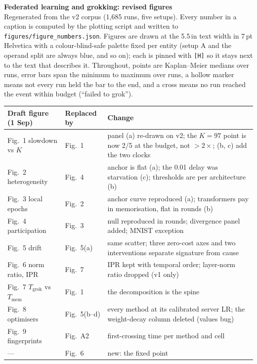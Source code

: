 \documentclass[10pt]{article}
\begin{document}
{\Large\bfseries Federated learning and grokking: revised figures}\\[2pt]
{\small Regenerated from the v2 corpus (1{,}685 runs, five setups). Every number in a caption is computed by the plotting script and written to \texttt{figures/figure\_numbers.json}. Figures are drawn at the 5.5\,in text width in 7\,pt Helvetica with a colour-blind-safe palette fixed per entity (setup A and the operand split are always blue, and so on); each is pinned with \texttt{[H]} so it stays next to the text that describes it. Throughout, points are Kaplan--Meier medians over runs, error bars span the minimum to maximum over runs, a hollow marker means not every run held the bar to the end, and a cross means no run reached the event within budget (``failed to grok'').}

\medskip
\begin{tabular}{@{}p{1.0in}p{0.65in}p{3.4in}@{}}
\toprule
Draft figure (1 Sep) & Replaced by & Change \\
\midrule
Fig.\ 1 slowdown vs $K$ & Fig.\ 1 & panel (a) re-drawn on v2; the $K{=}97$ point is now 2/5 at the budget, not $>2\times$; (b, c) add the two clocks \\
Fig.\ 2 heterogeneity & Fig.\ 4 & anchor is flat (a); the 0.01 delay was starvation (c); thresholds are per architecture (b) \\
Fig.\ 3 local epochs & Fig.\ 2 & anchor curve reproduced (a); transformers pay in memorisation, flat in rounds (b) \\
Fig.\ 4 participation & Fig.\ 3 & null reproduced in rounds; divergence panel added; MNIST exception \\
Fig.\ 5 drift & Fig.\ 5(a) & same scatter; three zero-cost axes and two interventions separate signature from cause \\
Fig.\ 6 norm ratio, IPR & Fig.\ 7 & IPR kept with temporal order; layer-norm ratio dropped (v1 only) \\
Fig.\ 7 $T_{\mathrm{grok}}$ vs $T_{\mathrm{mem}}$ & Fig.\ 1 & the decomposition is the spine \\
Fig.\ 8 optimisers & Fig.\ 5(b--d) & every method at its calibrated server LR; the weight-decay column deleted (values bug) \\
Fig.\ 9 fingerprints & Fig.\ A2 & first-crossing time per method and cell \\
--- & Fig.\ 6 & new: the fixed point \\
\bottomrule
\end{tabular}
\end{document}
